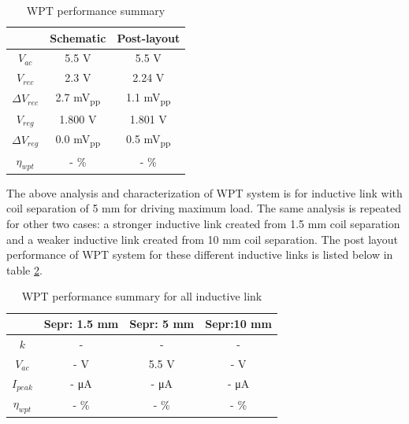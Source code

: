 \documentclass[12pt,a4paper,UKenglish]{article}
\begin{document}
\begin{table}[H]
\caption{WPT performance summary} 
\begin{center}
\begin{tabular}{c|c|c}
\hline \hline
					& \textbf{Schematic}	& \textbf{Post-layout} 	\\
\hline \hline
$V_{ac}$			& 5.5 \si{\volt}		& 5.5 \si{\volt} \\ \hline
$V_{rec}$ 			& 2.3 \si{\volt}		& 2.24 V	\\ \hline
$\Delta V_{rec}$	& 2.7 \si{\milli\volt}\textsubscript{pp} & 1.1 \si{\milli\volt}\textsubscript{pp}		\\ \hline
$V_{reg}$			& 1.800	\si{\volt}		& 1.801 \si{\volt}			\\ \hline
$\Delta V_{reg}$ 	& 0.0 \si{\milli\volt}\textsubscript{pp} & 0.5 \si{\milli\volt}\textsubscript{pp}		\\ \hline
$\eta_{wpt}$		& -	 \%				& - \%		\\ 
 
\hline \hline
\end{tabular}
\end{center}
\label{tab:wpt_spec}
\end{table}%

The above analysis and characterization of WPT system is for inductive link with coil separation of 5 mm for driving maximum load. The same analysis is repeated for other two cases: a stronger inductive link created from 1.5 mm coil separation and a weaker inductive link created from 10 mm coil separation. The post layout performance of WPT system for these different inductive links is listed below in table \ref{tab:wpt_spec_all}.

\begin{table}[H]
\caption{WPT performance summary for all inductive link} 
\begin{center}
\begin{tabular}{c|c|c|c}
\hline \hline
					& \textbf{Sepr: 1.5 mm}	& \textbf{Sepr: 5 mm} 	& \textbf{Sepr:10 mm} \\ \hline \hline
$ k $				& -						& -						& -		\\ \hline
$V_{ac}$			& - \si{\volt}			& 5.5 \si{\volt} 		& -	\si{\volt}	\\ \hline
$I_{peak}$			& - \si{\micro\ampere}	& - \si{\micro\ampere} 	& - \si{\micro\ampere} \\ \hline
$\eta_{wpt}$		& -	\%					& - \%					& - \% \\ 
 
\hline \hline
\end{tabular}
\end{center}
\label{tab:wpt_spec_all}
\end{table}%
\end{document}
